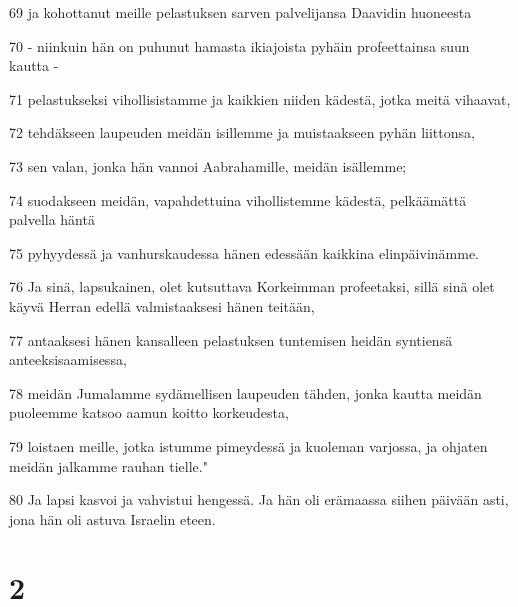 \par 69 ja kohottanut meille pelastuksen sarven palvelijansa Daavidin huoneesta
\par 70 - niinkuin hän on puhunut hamasta ikiajoista pyhäin profeettainsa suun kautta -
\par 71 pelastukseksi vihollisistamme ja kaikkien niiden kädestä, jotka meitä vihaavat,
\par 72 tehdäkseen laupeuden meidän isillemme ja muistaakseen pyhän liittonsa,
\par 73 sen valan, jonka hän vannoi Aabrahamille, meidän isällemme;
\par 74 suodakseen meidän, vapahdettuina vihollistemme kädestä, pelkäämättä palvella häntä
\par 75 pyhyydessä ja vanhurskaudessa hänen edessään kaikkina elinpäivinämme.
\par 76 Ja sinä, lapsukainen, olet kutsuttava Korkeimman profeetaksi, sillä sinä olet käyvä Herran edellä valmistaaksesi hänen teitään,
\par 77 antaaksesi hänen kansalleen pelastuksen tuntemisen heidän syntiensä anteeksisaamisessa,
\par 78 meidän Jumalamme sydämellisen laupeuden tähden, jonka kautta meidän puoleemme katsoo aamun koitto korkeudesta,
\par 79 loistaen meille, jotka istumme pimeydessä ja kuoleman varjossa, ja ohjaten meidän jalkamme rauhan tielle."
\par 80 Ja lapsi kasvoi ja vahvistui hengessä. Ja hän oli erämaassa siihen päivään asti, jona hän oli astuva Israelin eteen.

\chapter{2}

